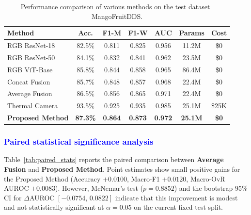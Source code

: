 \documentclass[utf8]{FrontiersinHarvard} %
\begin{document}
\begin{table}[h!]
    \caption{Performance comparison of various methods on the test dataset MangoFruitDDS. }
    \label{tab:performance}
    \raggedright
    \scriptsize
    \begin{tabular}{lcccccc}
        \toprule
        \textbf{Method} & \textbf{Acc.} & \textbf{F1-M} & \textbf{F1-W} & \textbf{AUC} & \textbf{Params} & \textbf{Cost} \\
        \midrule
        RGB ResNet-18 & 82.5\% & 0.811 & 0.825 & 0.956 & 11.2M & \$0 \\
        RGB ResNet-50 & 84.1\% & 0.832 & 0.841 & 0.962 & 23.5M & \$0 \\
        RGB ViT-Base & 85.8\% & 0.844 & 0.858 & 0.965 & 86.4M & \$0 \\
        Concat Fusion & 85.7\% & 0.848 & 0.857 & 0.968 & 22.4M & \$0 \\
        Average Fusion & 86.5\% & 0.856 & 0.865 & 0.971 & 22.4M & \$0 \\
        Thermal Camera & 93.5\% & 0.925 & 0.935 & 0.985 & 25.1M & \$25K \\
        \textbf{Proposed Method} & \textbf{87.3\%} & \textbf{0.864} & \textbf{0.873} & \textbf{0.972} & \textbf{25.1M} & \textbf{\$0} \\
        \bottomrule
    \end{tabular}
\end{table}

\subsubsection{\textcolor{blue}{Paired statistical significance analysis}}
\label{sec:paired_stat_table}
Table~\ref{tab:paired_stats} reports the paired comparison between \textbf{Average Fusion} and \textbf{Proposed Method}. Point estimates show small positive gains for the Proposed Method (Accuracy \(+0.0100\), Macro-F1 \(+0.0120\), Macro-OvR AUROC \(+0.0083\)). However, McNemar's test (\(p=0.8852\)) and the bootstrap \(95\%\) CI for \(\Delta\)AUROC \(\left[-0.0754,\,0.0822\right]\) indicate that this improvement is modest and not statistically significant at \(\alpha=0.05\) on the current fixed test split.
\end{document}
